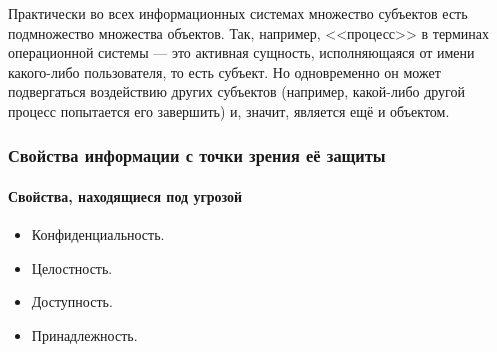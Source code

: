 Практически во всех информационных системах множество субъектов есть подмножество множества объектов. Так, например, <<процесс>> в терминах операционной системы --- это активная сущность, исполняющаяся от имени какого-либо пользователя, то есть субъект. Но одновременно он может подвергаться воздействию других субъектов (например, какой-либо другой процесс попытается его завершить) и, значит, является ещё и объектом.


\begin{frame}
    \frametitle{Свойства информации с точки зрения её защиты}
    \framesubtitle{Свойства, находящиеся под угрозой}

    \begin{itemize}
        \item Конфиденциальность. 
        
        \item Целостность. 
        
        \item Доступность. 
        
        \item Принадлежность. 
    \end{itemize}
\end{frame}


